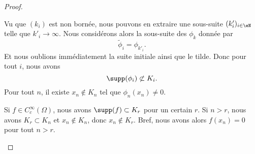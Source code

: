 \begin{proof}
\begin{subproof}

		Vu que \( (k_i)\) est non bornée, nous pouvons en extraire une sous-suite \( (k'_i)_{i\in \eN}\) telle que \( k'_i\to \infty \). Nous considérons alors la sous-suite des \( \phi_k\) donnée par
		\begin{equation}
			\tilde \phi_i=\phi_{k'_i}.
		\end{equation}
		Et nous oublions immédiatement la suite initiale ainsi que le tilde. Donc pour tout \( i\), nous avons
		\begin{equation}
			\supp(\phi_i) \not\subset K_i.
		\end{equation}
		Pour tout \( n\), il existe \( x_n\not\in K_n\) tel que \( \phi_n(x_n)\neq 0\).


		Si \( f\in C^{\infty}_c(\Omega)\), nous avons \( \supp(f)\subset K_r\) pour un certain \( r\). Si \( n>r\), nous avons \( K_r\subset K_n\) et \( x_n\not\in K_n\), donc \( x_n\not\in K_r\). Bref, nous avons alors \( f(x_n)=0\) pour tout \( n>r\).


\end{subproof}
\end{proof}
